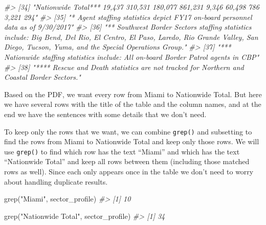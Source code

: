 \documentclass[
]{krantz}
\makeatletter
\newenvironment{Shaded}{\begin{snugshade}}{\end{snugshade}}
\newcommand{\CommentTok}[1]{\textcolor[rgb]{0.37,0.37,0.37}{\textit{#1}}}
\newcommand{\FunctionTok}[1]{\textcolor[rgb]{0,0,0}{#1}}
\newcommand{\NormalTok}[1]{#1}
\newcommand{\StringTok}[1]{\textcolor[rgb]{0.5,0.5,0.5}{#1}}
\newenvironment{kframe}{%
\medskip{}
\setlength{\fboxsep}{.8em}
 \def\at@end@of@kframe{}%
 \ifinner\ifhmode%
  \def\at@end@of@kframe{\end{minipage}}%
  \begin{minipage}{\columnwidth}%
 \fi\fi%
 \def\FrameCommand##1{\hskip\@totalleftmargin \hskip-\fboxsep
 \colorbox{shadecolor}{##1}\hskip-\fboxsep
     \hskip-\linewidth \hskip-\@totalleftmargin \hskip\columnwidth}%
 \MakeFramed {\advance\hsize-\width
   \@totalleftmargin\z@ \linewidth\hsize
   \@setminipage}}%
 {\par\unskip\endMakeFramed%
 \at@end@of@kframe}
\renewenvironment{Shaded}{\begin{kframe}}{\end{kframe}}
\makeatother
\begin{document}
\begin{Shaded}
\begin{Highlighting}[]
\CommentTok{\#\textgreater{} [34] "Nationwide Total***                             19,437            310,531                  180,077                 861,231            9,346            60,498            786            3,221    294"      }
\CommentTok{\#\textgreater{} [35] "* Agent staffing statistics depict FY17 on{-}board personnel data as of 9/30/2017"                                                                                                                           }
\CommentTok{\#\textgreater{} [36] "** Southwest Border Sectors staffing statistics include: Big Bend, Del Rio, El Centro, El Paso, Laredo, Rio Grande Valley, San Diego, Tucson, Yuma, and the Special Operations Group."                     }
\CommentTok{\#\textgreater{} [37] "*** Nationwide staffing statistics include: All on{-}board Border Patrol agents in CBP"                                                                                                                      }
\CommentTok{\#\textgreater{} [38] "**** Rescue and Death statistics are not tracked for Northern and Coastal Border Sectors."}
\end{Highlighting}
\end{Shaded}

Based on the PDF, we want every row from Miami to Nationwide Total. But here we have several rows with the title of the table and the column names, and at the end we have the sentences with some details that we don't need.

To keep only the rows that we want, we can combine \texttt{grep()} and subsetting to find the rows from Miami to Nationwide Total and keep only those rows. We will use \texttt{grep()} to find which row has the text ``Miami'' and which has the text ``Nationwide Total'' and keep all rows between them (including those matched rows as well). Since each only appears once in the table we don't need to worry about handling duplicate results.

\begin{Shaded}
\begin{Highlighting}[]
\FunctionTok{grep}\NormalTok{(}\StringTok{"Miami"}\NormalTok{, sector\_profile)}
\CommentTok{\#\textgreater{} [1] 10}
\end{Highlighting}
\end{Shaded}

\begin{Shaded}
\begin{Highlighting}[]
\FunctionTok{grep}\NormalTok{(}\StringTok{"Nationwide Total"}\NormalTok{, sector\_profile)}
\CommentTok{\#\textgreater{} [1] 34}
\end{Highlighting}
\end{Shaded}
\end{document}
